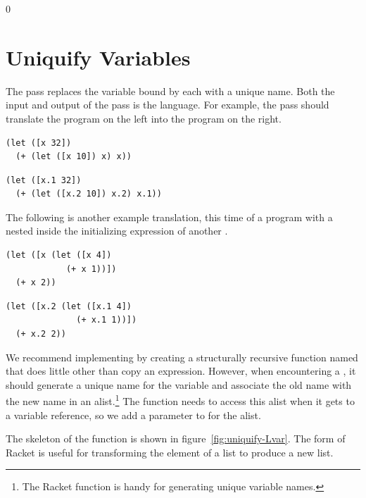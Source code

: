 \documentclass[7x10]{TimesAPriori_MIT}%
\def\racketEd{0}
\providecommand{\BookEdition}{1}
\let\edition\BookEdition
\numberwithin{theorem}{chapter}
\numberwithin{definition}{chapter}
\numberwithin{equation}{chapter}
\begin{document}
{\if\edition\racketEd  
\section{Uniquify Variables}
\label{sec:uniquify-Lvar}

The  pass replaces the variable bound by each 
with a unique name. Both the input and output of the 
pass is the \LangVar{} language. For example, the  pass
should translate the program on the left into the program on the
right.
\begin{transformation}
\begin{lstlisting}
(let ([x 32])
  (+ (let ([x 10]) x) x))
\end{lstlisting}
\compilesto
\begin{lstlisting}
(let ([x.1 32])
  (+ (let ([x.2 10]) x.2) x.1))
\end{lstlisting}
\end{transformation}
The following is another example translation, this time of a program
with a  nested inside the initializing expression of another
.
\begin{transformation}
\begin{lstlisting}
(let ([x (let ([x 4])
            (+ x 1))])
  (+ x 2))
\end{lstlisting}
\compilesto
\begin{lstlisting}
(let ([x.2 (let ([x.1 4])
              (+ x.1 1))])
  (+ x.2 2))
\end{lstlisting}
\end{transformation}

We recommend implementing  by creating a structurally
recursive function named  that does little other
than copy an expression. However, when encountering a , it
should generate a unique name for the variable and associate the old
name with the new name in an alist.\footnote{The Racket function
   is handy for generating unique variable names.} The
 function needs to access this alist when it gets
to a variable reference, so we add a parameter to 
for the alist.

The skeleton of the  function is shown in
figure~\ref{fig:uniquify-Lvar}.
The
%
\href{https://docs.racket-lang.org/reference/for.html#%28form._%28%28lib._racket%2Fprivate%2Fbase..rkt%29._for%2Flist%29%29}{\key{for/list}}
%
form of Racket is useful for transforming the element of a list to
produce a new list.

}
\end{document}
